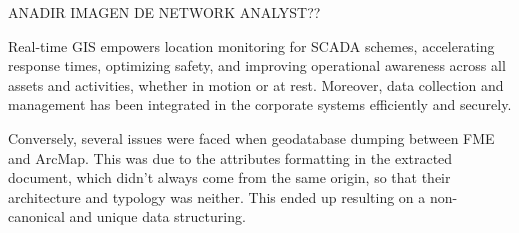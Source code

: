 ANADIR IMAGEN DE NETWORK ANALYST??

Real-time GIS empowers location monitoring for SCADA schemes, accelerating response times, optimizing safety, and improving operational awareness across all assets and activities, whether in motion or at rest. Moreover, data collection and management has been integrated in the corporate systems efficiently and securely.

Conversely, several issues were faced when geodatabase dumping between FME and ArcMap. This was due to the attributes formatting in the extracted document, which didn't always come from the same origin, so that their architecture and typology was neither. This ended up resulting on a non-canonical and unique data structuring. 





